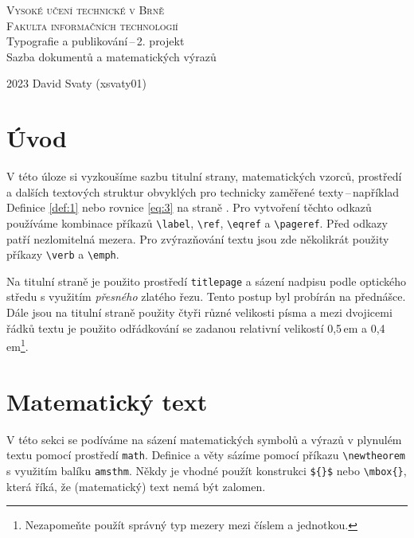 \documentclass[hidelinks, twocolumn, a4paper, 11pt]{article}
\theoremstyle{definition}
\begin{document}
\begin{titlepage}
    
    \begin{center}
        {\Huge \textsc{Vysoké učení technické v Brně}\\[0.5em]}
        {\huge \textsc{Fakulta informačních technologií}\\}
        {\LARGE Typografie a publikování\,--\,2. projekt}\\[0.4em]
        {\LARGE Sazba dokumentů a matematických výrazů \\}
    \end{center}

    {\Large 2023 \hfill David Svaty (xsvaty01)}

\end{titlepage}

\label{pag:1}
\section*{Úvod}
V této úloze si vyzkoušíme sazbu titulní strany, matematických vzorců,
prostředí a dalších textových struktur obvyklých pro technicky zaměřené texty\,--\,například 
Definice \ref{def:1} nebo rovnice \eqref{eq:3} na straně \pageref{pag:1}.
Pro vytvoření těchto odkazů používáme kombinace příkazů
\verb|\label|, \verb|\ref|, \verb|\eqref| a \verb|\pageref|. Před odkazy patří nezlomitelná mezera.
Pro zvýrazňování textu jsou zde několikrát použity příkazy \verb|\verb| a \verb|\emph|.

Na titulní straně je použito prostředí \verb|titlepage| a sázení nadpisu podle optického
středu s využitím \emph{přesného} zlatého řezu. Tento postup byl probírán na přednášce.
Dále jsou na titulní straně použity čtyři různé velikosti písma a 
mezi dvojicemi řádků textu je použito odřádkování se zadanou relativní velikostí 
0,5\,em a 0,4\,em\footnote[1]{Nezapomeňte použít správný typ mezery mezi číslem a jednotkou.}.

\section{Matematický text}
V této sekci se podíváme na sázení matematických symbolů a výrazů v plynulém textu 
pomocí prostředí \verb|math|. Definice a věty sázíme pomocí příkazu \verb|\newtheorem| s 
využitím balíku \verb|amsthm|. Někdy je vhodné použít konstrukci \verb|${}$| nebo \verb|\mbox{}|, 
která říká, že (matematický) text nemá být zalomen. 
\end{document}
